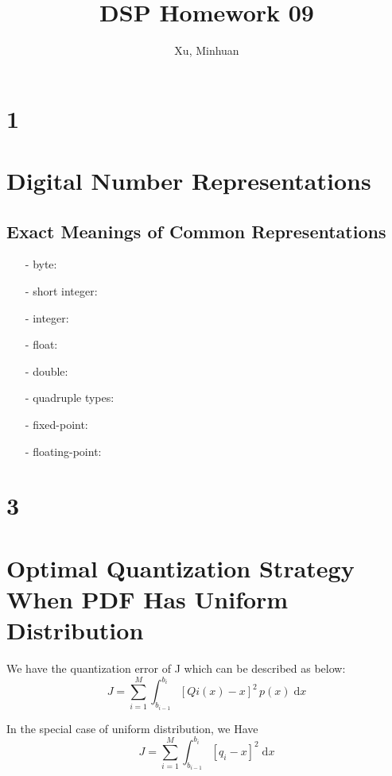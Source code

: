 \documentclass{article}
\begin{document}
\title{DSP Homework 09}
\author{Xu, Minhuan}
\maketitle
\tableofcontents
\begin{abstract}

\end{abstract}

\section{1}

\section{Digital Number Representations}

\subsection{Exact Meanings of Common Representations}
\begin{enumerate}
	\item[-] byte: 
	\item[-] short integer: 
	\item[-] integer: 
	\item[-] float: 
	\item[-] double: 
	\item[-] quadruple types: 
	\item[-] fixed-point: 
	\item[-] floating-point: 
\end{enumerate}

\section{3}

\section{Optimal Quantization Strategy When PDF Has Uniform Distribution}
We have the quantization error of J which can be described as below:
\begin{equation}
J = \sum_{i = 1}^{M}  \int_{b_{i - 1}}^{b_i} [Qi(x) - x]^2 \, p(x) \; \mathrm{d}x
\end{equation}

In the special case of uniform distribution, we Have
\begin{equation}
J = \sum_{i = 1}^{M}  \int_{b_{i - 1}}^{b_i} [q_i - x]^2 \; \mathrm{d}x
\label{eq:label}
\end{equation}
\end{document}
